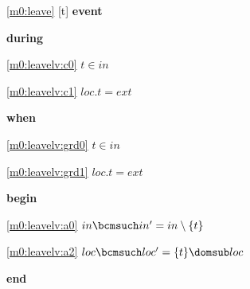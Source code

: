 \noindent \ref{m0:leave} [t] \textbf{event}
\begin{block}
  \item   \textbf{during}
  \begin{block}
  \item[ \eqref{m0:leavelv:c0} ]$t \in in $ %
  \item[ \eqref{m0:leavelv:c1} ]$loc.t = ext $ %
  \end{block}
  \item   \textbf{when}
  \begin{block}
  \item[ \eqref{m0:leavelv:grd0} ]$t \in in $ %
  \item[ \eqref{m0:leavelv:grd1} ]$loc.t = ext $ %
  \end{block}
  \item   \textbf{begin}
  \begin{block}
  \item[ \eqref{m0:leavelv:a0} ]$in \bcmsuch in' = in \setminus \{ t \} $ %
  \item[ \eqref{m0:leavelv:a2} ]$loc \bcmsuch loc' = \{ t \} \domsub loc $ %
  \end{block}
  \item   \textbf{end} \\
\end{block}

